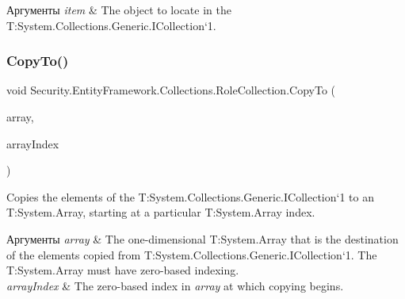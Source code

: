 \begin{DoxyParams}{Аргументы}
{\em item} & The object to locate in the T\+:\+System.\+Collections.\+Generic.\+I\+Collection`1.\\
\hline
\end{DoxyParams}
\mbox{\label{class_security_1_1_entity_framework_1_1_collections_1_1_role_collection_ae2b225130ca92d4a64f81b8fc164bfda}} 
\subsubsection{\texorpdfstring{Copy\+To()}{CopyTo()}}
{\footnotesize\ttfamily void Security.\+Entity\+Framework.\+Collections.\+Role\+Collection.\+Copy\+To (\begin{DoxyParamCaption}\item[{\hyperlink{interface_security_1_1_interfaces_1_1_model_1_1_i_role}{I\+Role} \mbox{[}$\,$\mbox{]}}]{array,  }\item[{int}]{array\+Index }\end{DoxyParamCaption})}



Copies the elements of the T\+:\+System.\+Collections.\+Generic.\+I\+Collection`1 to an T\+:\+System.\+Array, starting at a particular T\+:\+System.\+Array index. 


\begin{DoxyParams}{Аргументы}
{\em array} & The one-\/dimensional T\+:\+System.\+Array that is the destination of the elements copied from T\+:\+System.\+Collections.\+Generic.\+I\+Collection`1. The T\+:\+System.\+Array must have zero-\/based indexing.\\
\hline
{\em array\+Index} & The zero-\/based index in {\itshape array}  at which copying begins.\\
\hline
\end{DoxyParams}

